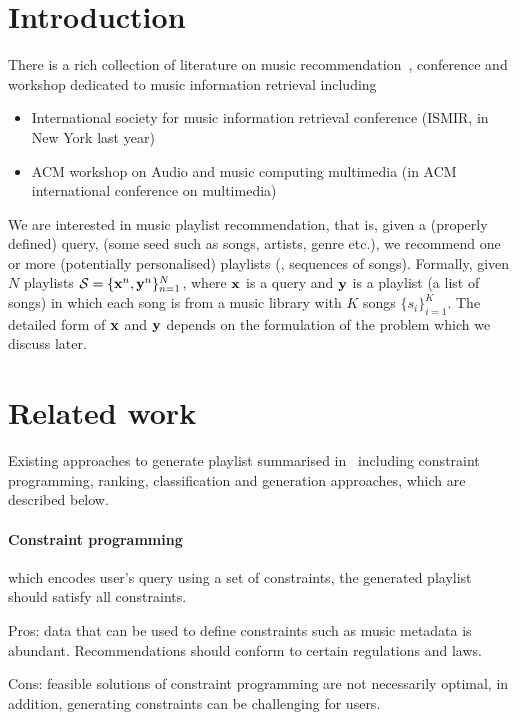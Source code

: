 \section{Introduction}
\label{sec:intro}

There is a rich collection of literature on music recommendation~\cite{recsysbook2015}, 
conference and workshop dedicated to music information retrieval including
\begin{itemize}
\item International society for music information retrieval conference (ISMIR, in New York last year)
\item ACM workshop on Audio and music computing multimedia (in ACM international conference on multimedia)
\end{itemize}

We are interested in music playlist recommendation, 
that is, given a (properly defined) query, (\ie some seed such as songs, artists, genre etc.), 
we recommend one or more (potentially personalised) playlists (\ie, sequences of songs).
Formally, given $N$ playlists $\mathcal{S} = \{\mathbf{x}^n, \mathbf{y}^n\}_{n=1}^N$, where $\mathbf{x}$ is a query and $\mathbf{y}$ is a playlist (\ie a list of songs) in which 
each song is from a music library with $K$ songs $\{s_i\}_{i=1}^K$.
The detailed form of $\mathbf{x}$ and $\mathbf{y}$ depends on the formulation of the problem which we discuss later.


\section{Related work}
\label{sec:related}

Existing approaches to generate playlist summarised in~\cite{recsysbook2015} including
constraint programming, ranking, classification and generation approaches, which are described below.

\paragraph{Constraint programming} which encodes user's query using a set of constraints, 
the generated playlist should satisfy all constraints.
\begin{description}
\item Pros: data that can be used to define constraints such as music metadata is abundant. 
            Recommendations should conform to certain regulations and laws.
\item Cons: feasible solutions of constraint programming are not necessarily optimal, in addition, 
            generating constraints can be challenging for users.
\end{description}



